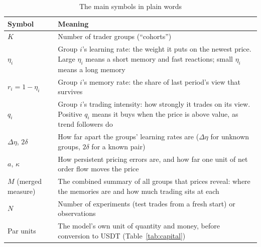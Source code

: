 \documentclass[12pt]{article}
\theoremstyle{definition}
\theoremstyle{remark}
\begin{document}
\begin{table}[!htbp]\centering\small
\begin{threeparttable}
\caption{The main symbols in plain words}\label{tab:glossary}
\begin{tabular}{>{\raggedright\arraybackslash}p{}>{\raggedright\arraybackslash}p{}}
\toprule
Symbol & Meaning\\
\midrule
$K$ & Number of trader groups (``cohorts'')\\
$\eta_i$ & Group $i$'s learning rate: the weight it puts on the newest price. Large $\eta_i$ means a short memory and fast reactions; small $\eta_i$ means a long memory\\
$r_i=1-\eta_i$ & Group $i$'s memory rate: the share of last period's view that survives\\
$q_i$ & Group $i$'s trading intensity: how strongly it trades on its view. Positive $q_i$ means it buys when the price is above value, as trend followers do\\
$\Delta\eta$, $2\delta$ & How far apart the groups' learning rates are ($\Delta\eta$ for unknown groups, $2\delta$ for a known pair)\\
$a$, $\kappa$ & How persistent pricing errors are, and how far one unit of net order flow moves the price\\
$M$ (merged measure) & The combined summary of all groups that prices reveal: where the memories are and how much trading sits at each\\
$N$ & Number of experiments (test trades from a fresh start) or observations\\
Par units & The model's own unit of quantity and money, before conversion to USDT (Table~\ref{tab:capital})\\
\bottomrule
\end{tabular}
\end{threeparttable}
\end{table}
\end{document}
